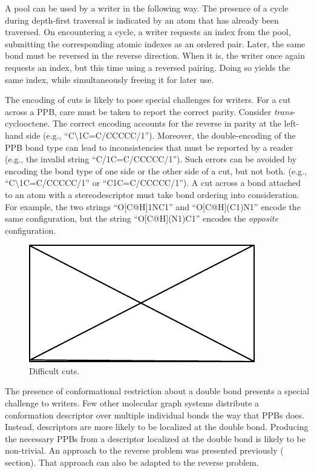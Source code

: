 \documentclass{article}
\begin{document}
A pool can be used by a writer in the following way. The presence of a cycle during depth-first traversal is indicated by an atom that has already been traversed. On encountering a cycle, a writer requests an index from the pool, submitting the corresponding atomic indexes as an ordered pair. Later, the same bond must be reversed in the reverse direction. When it is, the writer once again requests an index, but this time using a reversed pairing. Doing so yields the same index, while simultaneously freeing it for later use.

The encoding of cuts is likely to pose special challenges for writers. For a cut across a PPB, care must be taken to report the correct parity. Consider \textit{trans}-cyclooctene. The correct encoding accounts for the reverse in parity at the left-hand side (e.g., \enquote{C{\textbackslash}1C=C/CCCCC/1}). Moreover, the double-encoding of the PPB bond type can lead to inconsistencies that must be reported by a reader (e.g., the invalid string \enquote{C/1C=C/CCCCC/1}). Such errors can be avoided by encoding the bond type of one side or the other side of a cut, but not both. (e.g., \enquote{C{\textbackslash}1C=C/CCCCC/1} or \enquote{C1C=C/CCCCC/1}). A cut across a bond attached to an atom with a stereodescriptor must take bond ordering into consideration. For example, the two strings \enquote{O[C@H]1NC1} and \enquote{O[C@H](C1)N1} encode the same configuration, but the string \enquote{O[C@H](N1)C1} encodes the \textit{opposite} configuration. 

\begin{figure}
    \centering
    \includegraphics{filler}
    \caption{Difficult cuts.}
    \label{fig:difficult-cuts}
\end{figure}

The presence of conformational restriction about a double bond presents a special challenge to writers. Few other molecular graph systems distribute a conformation descriptor over multiple individual bonds the way that PPBs does. Instead, descriptors are more likely to be localized at the double bond. Producing the necessary PPBs from a descriptor localized at the double bond is likely to be non-trivial. An approach to the reverse problem was presented previously ( section). That approach can also be adapted to the reverse problem.
\end{document}
